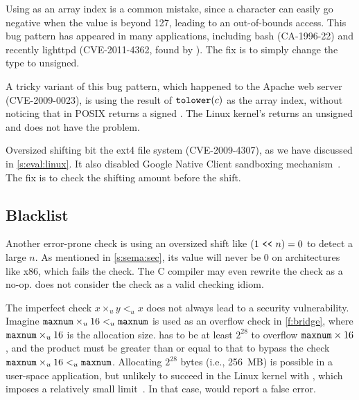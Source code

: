 Using  as an array index is a common mistake, since a
character can easily go negative when the value is beyond 127,
leading to an out-of-bounds access.  This bug pattern has appeared
in many applications, including bash (CA-1996-22) and recently
lighttpd (CVE-2011-4362, found by \sys).  The fix is to simply
change the type to unsigned.

A tricky variant of this bug pattern, which happened to the Apache
web server (CVE-2009-0023), is using the result of $\texttt{tolower}(c)$
as the array index, without noticing that in POSIX 
returns a signed .  The Linux kernel's  returns
an unsigned  and does not have the problem.

Oversized shifting bit the ext4 file system (CVE-2009-4307),
as we have discussed in \autoref{s:eval:linux}.
It also disabled Google Native Client sandboxing mechanism~\cite{nacl}.
The fix is to check the shifting amount before the shift.


\subsection{Blacklist}


Another error-prone check is using an oversized shift like $(1 \ \texttt{<}\texttt{<}\ 
n) = 0$ to detect a large $n$.  As mentioned in \autoref{s:sema:sec},
its value will never be 0 on architectures like x86, which fails
the check.  The C compiler may even rewrite the check as a no-op.
\sys does not consider the check as a valid checking idiom.

The imperfect check $x \times_u y <_u x$ does not always lead to a security vulnerability.
Imagine $\texttt{maxnum} \times_u 16 <_u \texttt{maxnum}$ is used as an
overflow check in \autoref{f:bridge}, where $\texttt{maxnum} \times_u
16$ is the allocation size.
 has to be at least $2^{28}$ to
overflow $\texttt{maxnum} \times 16$, and the product must be greater
than or equal to that to bypass the check $\texttt{maxnum} \times_u 16
<_u \texttt{maxnum}$.  Allocating $2^{28}$ bytes (i.e., 256~MB) is
possible in a user-space application, but unlikely to succeed in
the Linux kernel with , which imposes a relatively small
limit~\cite[\chapterautorefname~8]{ldd3}.  In that case, \sys
would report a false error.
